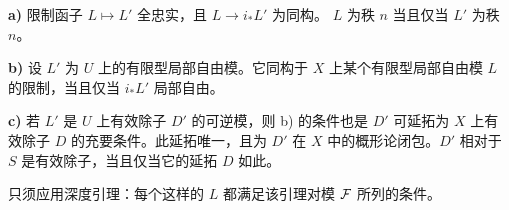 \noindent\textbf{a)} 限制函子 \(L\mapsto L'\) 全忠实，且 \(L\to i_*L'\) 为同构。
\(L\) 为秩 \(n\) 当且仅当 \(L'\) 为秩 \(n\)。

\noindent\textbf{b)} 设 \(L'\) 为 \(U\) 上的有限型局部自由模。它同构于 \(X\) 上某个有限型局部自由模 \(L\) 的限制，当且仅当 \(i_*L'\) 局部自由。

\noindent\textbf{c)} 若 \(L'\) 是 \(U\) 上有效除子 \(D'\) 的可逆模，则 b) 的条件也是 \(D'\) 可延拓为 \(X\) 上有效除子 \(D\) 的充要条件。此延拓唯一，且为 \(D'\) 在 \(X\) 中的概形论闭包。\(D'\) 相对于 \(S\) 是有效除子，当且仅当它的延拓 \(D\) 如此。

只须应用深度引理：每个这样的 \(L\) 都满足该引理对模 \(\mathcal F\) 所列的条件。
\par\endgroup
